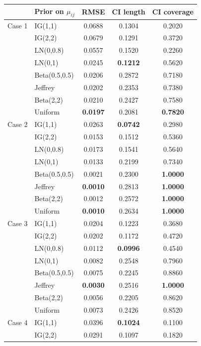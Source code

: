\documentclass{amsart}
\begin{document}
\begin{table}[ht]
\centering
\begin{tabular}{l|l|ccc}
  \toprule
 & Prior on $\mu_{ij}$ & RMSE & CI length & CI coverage \\ 
  \midrule
Case 1 & IG(1,1) & 0.0688 & 0.1304 & 0.2020 \\ 
   & IG(2,2) & 0.0679 & 0.1291 & 0.3720 \\ 
   & LN(0,0.8) & 0.0557 & 0.1520 & 0.2260 \\ 
   & LN(0,1) & 0.0245 & \textbf{0.1212} & 0.5620 \\ 
   & Beta(0.5,0.5) & 0.0206 & 0.2872 & 0.7180 \\ 
   & Jeffrey & 0.0202 & 0.2353 & 0.7380 \\ 
   & Beta(2,2) & 0.0210 & 0.2427 & 0.7580 \\ 
   & Uniform & \textbf{0.0197} & 0.2081 & \textbf{0.7820} \\ 
   \midrule
Case 2 & IG(1,1) & 0.0263 & \textbf{0.0742} & 0.2980 \\ 
   & IG(2,2) & 0.0153 & 0.1512 & 0.5360 \\ 
   & LN(0,0.8) & 0.0173 & 0.1541 & 0.5640 \\ 
   & LN(0,1) & 0.0133 & 0.2199 & 0.7340 \\ 
   & Beta(0.5,0.5) & 0.0021 & 0.2300 & \textbf{1.0000} \\ 
   & Jeffrey & \textbf{0.0010} & 0.2813 & \textbf{1.0000} \\ 
   & Beta(2,2) & 0.0012 & 0.2572 & \textbf{1.0000} \\ 
   & Uniform & \textbf{0.0010} & 0.2634 & \textbf{1.0000} \\ 
   \midrule
Case 3 & IG(1,1) & 0.0204 & 0.1223 & 0.3680 \\ 
   & IG(2,2) & 0.0202 & 0.1172 & 0.4720 \\ 
   & LN(0,0.8) & 0.0112 & \textbf{0.0996} & 0.4540 \\ 
   & LN(0,1) & 0.0082 & 0.2548 & 0.7960 \\ 
   & Beta(0.5,0.5) & 0.0075 & 0.2245 & 0.8860 \\ 
   & Jeffrey & \textbf{0.0030} & 0.2516 & \textbf{1.0000} \\ 
   & Beta(2,2) & 0.0056 & 0.2205 & 0.8620 \\ 
   & Uniform & 0.0073 & 0.2426 & 0.8520 \\ 
   \midrule
Case 4 & IG(1,1) & 0.0396 & \textbf{0.1024} & 0.1100 \\ 
   & IG(2,2) & 0.0291 & 0.1097 & 0.1820 \\ 

\end{tabular}
\end{table}
\end{document}
